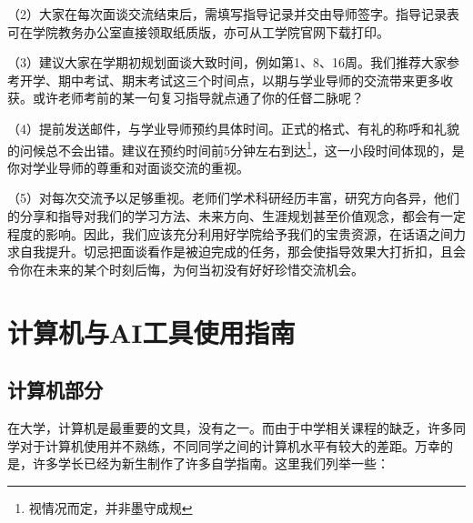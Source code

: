 \vspace{10pt}

（2）大家在每次面谈交流结束后，需填写指导记录并交由导师签字。指导记录表可在学院教务办公室直接领取纸质版，亦可从工学院官网下载打印。

\vspace{10pt}

（3）建议大家在学期初规划面谈大致时间，例如第1、8、16周。我们推荐大家参考开学、期中考试、期末考试这三个时间点，以期与学业导师的交流带来更多收获。或许老师考前的某一句复习指导就点通了你的任督二脉呢？

\vspace{10pt}

（4）提前发送邮件，与学业导师预约具体时间。正式的格式、有礼的称呼和礼貌的问候总不会出错。建议在预约时间前5分钟左右到达\footnote{视情况而定，并非墨守成规}，这一小段时间体现的，是你对学业导师的尊重和对面谈交流的重视。

\vspace{10pt}

（5）对每次交流予以足够重视。老师们学术科研经历丰富，研究方向各异，他们的分享和指导对我们的学习方法、未来方向、生涯规划甚至价值观念，都会有一定程度的影响。因此，我们应该充分利用好学院给予我们的宝贵资源，在话语之间力求自我提升。切忌把面谈看作是被迫完成的任务，那会使指导效果大打折扣，且会令你在未来的某个时刻后悔，为何当初没有好好珍惜交流机会。

\section{计算机与AI工具使用指南}

\subsection{计算机部分}

在大学，计算机是最重要的文具，没有之一。而由于中学相关课程的缺乏，许多同学对于计算机使用并不熟练，不同同学之间的计算机水平有较大的差距。万幸的是，许多学长已经为新生制作了许多自学指南。这里我们列举一些：

